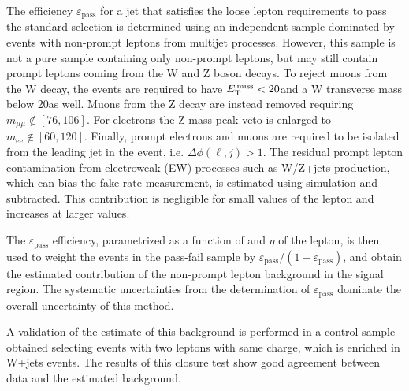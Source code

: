 The efficiency $\varepsilon_\mathrm{pass}$ for a jet that satisfies the loose lepton requirements to pass the standard selection is determined using an independent sample dominated by events with non-prompt leptons from multijet processes. However, this sample is not a pure sample containing only non-prompt leptons, but may still contain prompt leptons coming from the W and Z boson decays. To reject muons from the W decay, the events are required to have $E_\mathrm{T}^\mathrm{\,miss}<20$\GeV and a W transverse mass below 20\GeV as well. Muons from the Z decay are instead removed requiring $m_{\mu\mu} \notin [76,106]$\GeV. For electrons the Z mass peak veto is enlarged to $m_\mathrm{ee} \notin [60,120]$\GeV. Finally, prompt electrons and muons are required to be isolated from the leading jet in the event, i.e. $\Delta\phi(\ell,j)>1$. The residual prompt lepton contamination from electroweak (EW) processes such as W/Z+jets production, which can bias the fake rate measurement, is estimated using simulation and subtracted. This contribution is negligible for small values of the lepton \pt and increases at larger values.

The $\varepsilon_\mathrm{pass}$ efficiency, parametrized as a function of \pt and $\eta$ of the lepton, is then used to weight the events in the pass-fail sample by $\varepsilon_\mathrm{pass}/(1-\varepsilon_\mathrm{pass})$, and obtain the estimated contribution of the non-prompt lepton background in the signal region. The systematic uncertainties from the determination of $\varepsilon_\mathrm{pass}$ dominate the overall uncertainty of this method.

A validation of the estimate of this background is performed in a control sample obtained selecting events with two leptons with same charge, which is enriched in W+jets events. The results of this closure test show good agreement between data and the estimated background.

